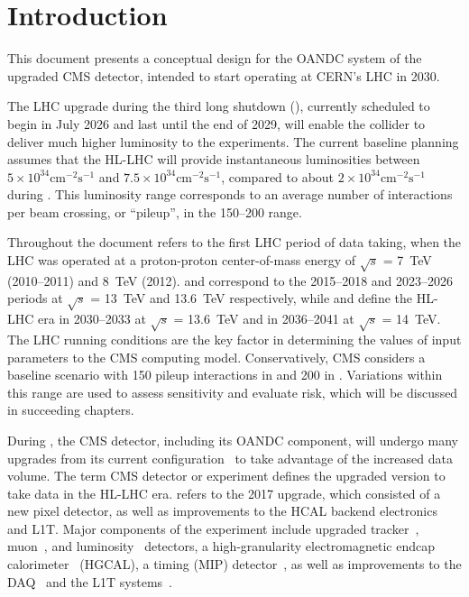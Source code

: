 %
%
% 
\glsresetall
\clearpage
\section{Introduction}
\label{sec:Introduction}

This document presents a conceptual design for the \gls{OANDC} system of the upgraded CMS detector, intended to start operating at CERN's LHC in 2030.

The LHC upgrade during the third long shutdown (\LSThree), currently scheduled to begin in July 2026 and last until the end of 2029, will enable the collider to deliver much higher luminosity to the experiments. The current baseline planning assumes that the \gls{HL-LHC} will provide instantaneous luminosities between $5\times10^{34}\mathrm{cm}^{-2}\mathrm{s}^{-1}$ and $7.5\times10^{34}\mathrm{cm}^{-2}\mathrm{s}^{-1}$, compared to about $2\times10^{34}\mathrm{cm}^{-2}\mathrm{s}^{-1}$ during \RunThree. This luminosity range corresponds to an average number of interactions per beam crossing, or ``pileup'', in the 150--200 range.

Throughout the document \RunOne refers to the first LHC period of data taking, when the LHC was operated at a proton-proton center-of-mass energy of $\sqrt{s}$ = 7~TeV (2010--2011) and 8~TeV (2012). \RunTwo and \RunThree correspond to the 2015--2018 and 2023--2026 periods at  $\sqrt{s}$ = 13~TeV and 13.6~TeV respectively, while \RunFour and \RunFive define the \gls{HL-LHC} era in 2030--2033 at $\sqrt{s}$ = 13.6~TeV and in 2036--2041 at $\sqrt{s}$ = 14~TeV. 
The LHC running conditions are the key factor in determining the values of input parameters to the CMS computing model. Conservatively, CMS considers a baseline scenario with 150 pileup interactions in \RunFour and 200 in \RunFive. Variations within this range are used to assess sensitivity and evaluate risk, which will be discussed in succeeding chapters.


During \LSThree, the CMS detector, including its \gls{OANDC} component, will undergo many upgrades from its current configuration~\cite{CMS:2023gfb} to take advantage of the increased data volume.
The term \PhaseTwo CMS detector or experiment defines the upgraded version to take data in the \gls{HL-LHC} era. \PhaseOne refers to the 2017 upgrade, which consisted of a new pixel detector, as well as improvements to the \gls{HCAL} backend electronics and \gls{L1T}. Major components of the \PhaseTwo experiment include upgraded tracker~\cite{CMS:2017TrackTDR,Ceccarelli:2024mev}, muon~\cite{CMS:2017MuonTDR}, and luminosity~\cite{CMS:2021BRTDR} detectors, a high-granularity electromagnetic endcap calorimeter~\cite{CMS:2017HGCalTDR} (\gls{HGCAL}), a timing (\gls{MIP}) detector~\cite{CMS:2019MIPTDR}, as well as improvements to the \gls{DAQ}~\cite{CMS:2021DAQTDR} and the \gls{L1T} systems~\cite{CMS:2020L1TTDR}.

